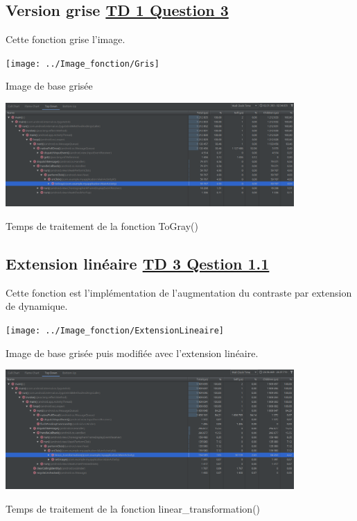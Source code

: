 \documentclass{article}
\begin{document}
\subsection{Version grise \underline{TD 1 Question 3}}
Cette fonction grise l'image.
\bigbreak

\begin{center} 
    \texttt{[image: ../Image\_fonction/Gris]}

    Image de base grisée
\end{center}

\begin{center} 
    \includegraphics[width=11cm]{../Image_temps/TempsToGray}

    Temps de traitement de la fonction ToGray()
\end{center}

\subsection{Extension linéaire \underline{TD 3 Qestion 1.1}}
Cette fonction est l'implémentation de l'augmentation du contraste par extension de dynamique.
\bigbreak

\begin{center} 
    \texttt{[image: ../Image\_fonction/ExtensionLineaire]}

    Image de base grisée puis modifiée avec l'extension linéaire.
\end{center}

\begin{center} 
    \includegraphics[width=11cm]{../Image_temps/TempsLinearTransformation}

    Temps de traitement de la fonction linear\_transformation()
\end{center}
\end{document}
